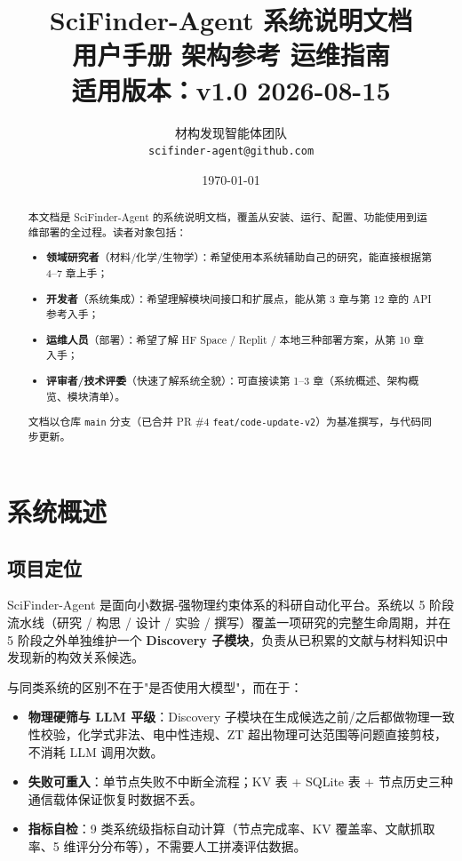\documentclass[11pt,a4paper]{article}
\title{\textbf{SciFinder-Agent 系统说明文档} \\[0.3em]
       \large 用户手册 \textbar{} 架构参考 \textbar{} 运维指南 \\[0.2em]
       \normalsize \textmd{适用版本：v1.0 \textbar{} 2026-08-15}}
\author{材构发现智能体团队 \\ \small \texttt{scifinder-agent@github.com}}
\date{\today}
\begin{document}
\maketitle

\begin{abstract}
\noindent 本文档是 SciFinder-Agent 的系统说明文档，覆盖从安装、运行、配置、功能使用到运维部署的全过程。读者对象包括：

\begin{itemize}[leftmargin=2em]
\item \textbf{领域研究者}（材料/化学/生物学）：希望使用本系统辅助自己的研究，能直接根据第 4--7 章上手；
\item \textbf{开发者}（系统集成）：希望理解模块间接口和扩展点，能从第 3 章与第 12 章的 API 参考入手；
\item \textbf{运维人员}（部署）：希望了解 HF Space / Replit / 本地三种部署方案，从第 10 章入手；
\item \textbf{评审者/技术评委}（快速了解系统全貌）：可直接读第 1--3 章（系统概述、架构概览、模块清单）。
\end{itemize}

文档以仓库 \texttt{main} 分支（已合并 PR \#4 \texttt{feat/code-update-v2}）为基准撰写，与代码同步更新。
\end{abstract}

\tableofcontents
\newpage

\section{系统概述}

\subsection{项目定位}

SciFinder-Agent 是面向小数据-强物理约束体系的科研自动化平台。系统以 5 阶段流水线（研究 / 构思 / 设计 / 实验 / 撰写）覆盖一项研究的完整生命周期，并在 5 阶段之外单独维护一个 \textbf{Discovery 子模块}，负责从已积累的文献与材料知识中发现新的构效关系候选。

与同类系统的区别不在于"是否使用大模型"，而在于：
\begin{itemize}[leftmargin=2em]
\item \textbf{物理硬筛与 LLM 平级}：Discovery 子模块在生成候选之前/之后都做物理一致性校验，化学式非法、电中性违规、ZT 超出物理可达范围等问题直接剪枝，不消耗 LLM 调用次数。
\item \textbf{失败可重入}：单节点失败不中断全流程；KV 表 + SQLite 表 + 节点历史三种通信载体保证恢复时数据不丢。
\item \textbf{指标自检}：9 类系统级指标自动计算（节点完成率、KV 覆盖率、文献抓取率、5 维评分分布等），不需要人工拼凑评估数据。
\end{itemize}
\end{document}
